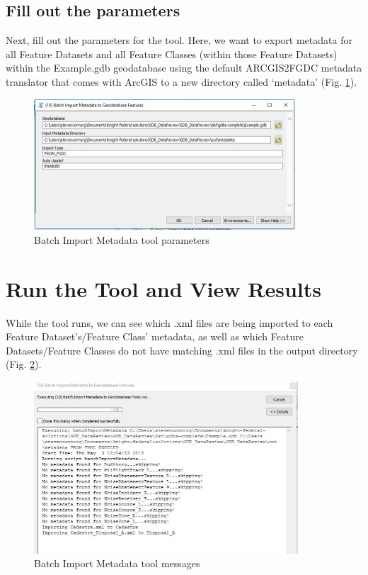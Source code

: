 \documentclass[openany]{book}
\theoremstyle{definition}
\theoremstyle{definition}
\theoremstyle{definition}
\theoremstyle{remark}
\begin{document}
\subsection{Fill out the parameters}\label{fill-out-the-parameters-11}

Next, fill out the parameters for the tool. Here, we want to export
metadata for all Feature Datasets and all Feature Classes (within those
Feature Datasets) within the Example.gdb geodatabase using the default
ARCGIS2FGDC metadata translator that comes with ArcGIS to a new
directory called `metadata' (Fig. \ref{fig:imMetaparams}).

\begin{figure}[H]

{\centering \includegraphics[width=3.84in,]{figures/imMeta-params} 

}

\caption{Batch Import Metadata tool parameters}\label{fig:imMetaparams}
\end{figure}

\section{Run the Tool and View
Results}\label{run-the-tool-and-view-results-11}

While the tool runs, we can see which .xml files are being imported to
each Feature Dataset's/Feature Class' metadata, as well as which Feature
Datasets/Feature Classes do not have matching .xml files in the output
directory (Fig. \ref{fig:imMetamessages}).

\begin{figure}[H]

{\centering \includegraphics[width=3.89in,]{figures/imMeta-messages} 

}

\caption{Batch Import Metadata tool messages}\label{fig:imMetamessages}
\end{figure}
\end{document}

